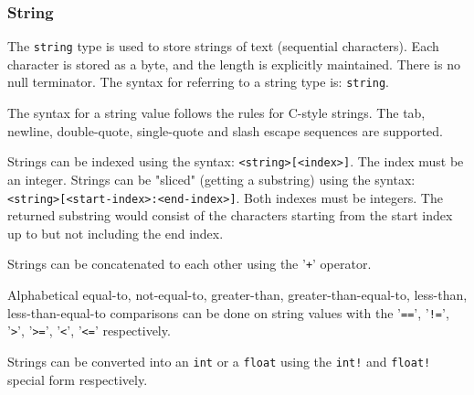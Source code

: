 
\subsubsection{String}
{
	The \texttt{string} type is used to store strings of
	text (sequential characters).
	Each character is stored as a byte, and the length is explicitly
	maintained. There is no null terminator.
	The syntax for referring to a string type is: \texttt{string}.
	
	The syntax for a string value follows the rules for C-style strings.
	The tab, newline, double-quote, single-quote and slash escape sequences
	are supported.
	
	Strings can be indexed using the syntax: \texttt{<string>[<index>]}. The
	index must be an integer.
	Strings can be "sliced" (getting a substring) using
	the syntax: \texttt{<string>[<start-index>:<end-index>]}. Both
	indexes must be integers. The returned substring would consist of
	the characters starting from the start index up to but not including
	the end index.
	
	Strings can be concatenated to each other using the '\texttt{+}' operator.
	
	Alphabetical equal-to, not-equal-to, greater-than, greater-than-equal-to,
	less-than, less-than-equal-to comparisons can be done on string values with
	the '\texttt{==}', '\texttt{!=}',
	'\texttt{>}', '\texttt{>=}', '\texttt{<}', '\texttt{<=}' respectively.
	
	Strings can be converted into
	an \texttt{int} or a \texttt{float} using
	the \texttt{int!} and \texttt{float!} special form respectively.
}
